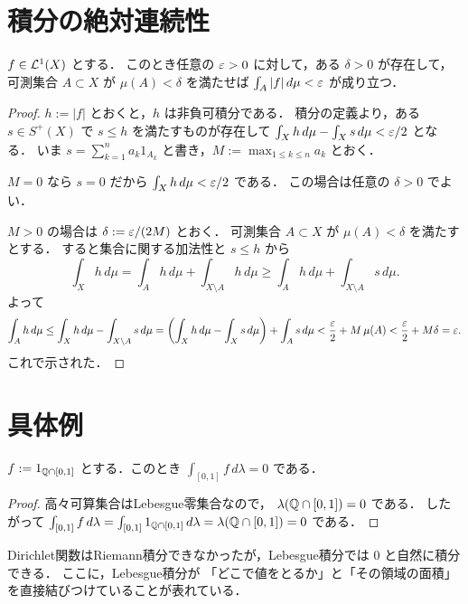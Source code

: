 \section{積分の絶対連続性}

\begin{theorem}[積分の絶対連続性]\label{thm:integral-absolute-continuity}
$f\in\mathcal L^1(X)$ とする．
このとき任意の $\varepsilon>0$ に対して，ある $\delta>0$ が存在して，
可測集合 $A \subset X$ が $\mu(A)<\delta$ を満たせば
$\int_A |f|\,d\mu<\varepsilon$ が成り立つ．
\end{theorem}
\begin{proof}
$h:=|f|$ とおくと，$h$ は非負可積分である．
積分の定義より，ある $s\in S^+(X)$ で $s \le h$ を満たすものが存在して
$\int_X h\,d\mu-\int_X s\,d\mu<\varepsilon/2$ となる．
いま $s=\sum_{k=1}^n a_k1_{A_k}$ と書き，$M:=\max_{1\le k\le n}a_k$ とおく．

$M=0$ なら $s=0$ だから
$\int_X h\,d\mu<\varepsilon/2$ である．
この場合は任意の $\delta>0$ でよい．

$M>0$ の場合は $\delta:=\varepsilon/(2M)$ とおく．
可測集合 $A \subset X$ が $\mu(A)<\delta$ を満たすとする．
すると集合に関する加法性と $s\le h$ から
\[
\int_X h\,d\mu
=\int_A h\,d\mu+\int_{X\setminus A}h\,d\mu
\ge \int_A h\,d\mu+\int_{X\setminus A}s\,d\mu.
\]
よって
\[
\int_A h\,d\mu
\le \int_X h\,d\mu-\int_{X\setminus A}s\,d\mu
=\left(\int_X h\,d\mu-\int_X s\,d\mu\right)+\int_A s\,d\mu
<\frac{\varepsilon}{2}+M\,\mu(A)
<\frac{\varepsilon}{2}+M\delta=\varepsilon.
\]
これで示された．
\end{proof}

\section{具体例}

\begin{example}[Dirichlet関数]
$f:=1_{\mathbb Q \cap [0,1]}$ とする．このとき $\int_{[0,1]} f\,d\lambda=0$ である．
\end{example}
\begin{proof}
高々可算集合はLebesgue零集合なので， $\lambda(\mathbb Q \cap [0,1])=0$ である．
したがって $\int_{[0,1]} f\,d\lambda=\int_{[0,1]} 1_{\mathbb Q \cap [0,1]}\,d\lambda=\lambda(\mathbb Q \cap [0,1])=0$ である．
\end{proof}

\begin{remark}
Dirichlet関数はRiemann積分できなかったが，Lebesgue積分では $0$ と自然に積分できる．
ここに，Lebesgue積分が
「どこで値をとるか」と「その領域の面積」を直接結びつけていることが表れている．
\end{remark}

